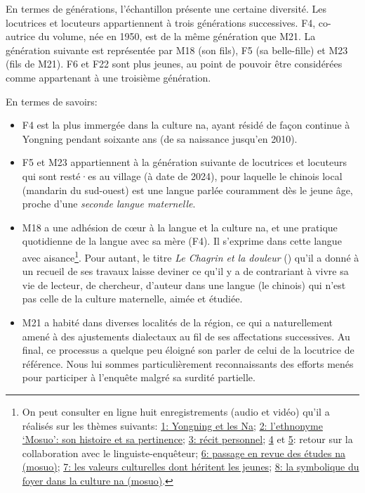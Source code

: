 En termes de générations, l'échantillon présente une certaine diversité. Les locutrices et locuteurs appartiennent à trois générations successives. F4, co-autrice du volume, née en 1950, est de la même génération que M21. La génération suivante est représentée par M18 (son fils), F5 (sa belle-fille) et M23 (fils de M21). F6 et F22 sont plus jeunes, au point de pouvoir être considérées comme appartenant à une troisième génération.

En termes de savoirs:

\begin{itemize}
    \item F4 est la plus immergée dans la culture na, ayant résidé de façon continue à Yongning pendant soixante ans (de sa naissance jusqu'en 2010).
    \item F5 et M23 appartiennent à la génération suivante de locutrices et locuteurs qui sont resté·es au village (à date de 2024), pour laquelle le chinois local (mandarin du sud-ouest) est une langue parlée couramment dès le jeune âge, proche d'une \emph{seconde langue maternelle}.
    \item M18 a une adhésion de cœur à la langue et la culture na, et une pratique quotidienne de la langue avec sa mère (F4). Il s'exprime dans cette langue avec aisance\footnote{On peut consulter en ligne huit enregistrements (audio et vidéo) qu'il a réalisés sur les thèmes suivants:
    \href{https://doi.org/10.24397/pangloss-0007734}{1: Yongning et les Na}; \href{https://doi.org/10.24397/pangloss-0007740}{2: l'ethnonyme ‘Mosuo’: son histoire et sa pertinence}; \href{https://doi.org/10.24397/pangloss-0007730}{3: récit personnel}; \href{https://doi.org/10.24397/pangloss-0007736}{4} et \href{https://doi.org/10.24397/pangloss-0007738}{5}: retour sur la collaboration avec le linguiste-enquêteur; \href{https://doi.org/10.24397/pangloss-0007742}{6: passage en revue des études na (mosuo)}; \href{https://doi.org/10.24397/pangloss-0007728}{7: les valeurs culturelles dont héritent les jeunes}; \href{https://doi.org/10.24397/pangloss-0007732}{8: la symbolique du foyer dans la culture na (mosuo)}.}.
    Pour autant, le titre \emph{Le Chagrin et la douleur} () qu'il a donné à un recueil de ses travaux \parencite{latami2016} laisse deviner ce qu'il y a de contrariant à vivre sa vie de lecteur, de chercheur, d'auteur dans une langue (le chinois) qui n'est pas celle de la culture maternelle, aimée et étudiée.
    \item M21 a habité dans diverses localités de la région, ce qui a naturellement amené à des ajustements dialectaux au fil de ses affectations successives. Au final, ce processus a quelque peu éloigné son parler de celui de la locutrice de référence. Nous lui sommes particulièrement reconnaissants des efforts menés pour participer à l'enquête malgré sa surdité partielle.
\end{itemize}
